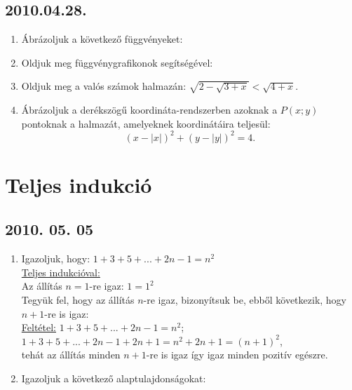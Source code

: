 \subsection*{2010.04.28.}
\begin{enumerate}
\item Ábrázoljuk a következő függvényeket:
\item Oldjuk meg függvénygrafikonok segítségével:
\item Oldjuk meg a valós számok halmazán: $\sqrt{2-\sqrt{3+x}}<\sqrt{4+x}$.
\item Ábrázoljuk a derékszögű koordináta-rendszerben azoknak a $P(x;y)$ pontoknak a halmazát, amelyeknek koordinátáira teljesül:
$$(x-|x|)^2+(y-|y|)^2=4.$$
\end{enumerate}

\section{Teljes indukció}
	
\subsection*{2010. 05. 05}
\begin{enumerate}
\item Igazoljuk, hogy: $1+3+5+...+2n-1=n^{2}$\\
\underline{Teljes indukcióval:}\\
Az állítás $n=1$-re igaz: $1=1^{2}$\\
Tegyük fel, hogy az állítás $n$-re igaz, bizonyítsuk be, ebből következik, hogy $n+1$-re is igaz:\\ 
\underline{Feltétel:}
$1+3+5+...+2n-1=n^{2}$;\\
$1+3+5+...+2n-1+2n+1=n ^{2}+2n+1=(n+1)^{2}$,\\ tehát az állítás minden $n+1$-re is igaz
így igaz minden pozitív egészre.
\item Igazoljuk a következő alaptulajdonságokat:
\end{enumerate}



